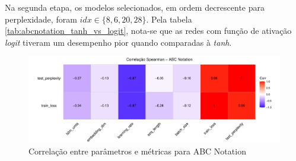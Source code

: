 \documentclass{automatextcc}
\begin{document}
Na segunda etapa, os modelos selecionados, em ordem decrescente para perplexidade, foram $idx \in \{8,6,20,28\}$. Pela tabela \ref{tab:abcnotation_tanh_vs_logit}, nota-se que as redes com função de ativação \textit{logit} tiveram um desempenho pior quando comparadas à \textit{tanh}.

\begin{figure}[H]
    \centering
    \includegraphics[width=\textwidth]{abcnotation_tanh_corr.pdf}
    \caption{Correlação entre parâmetros e métricas para ABC Notation}
    \label{fig:abcnotation_tanh_corr}
\end{figure}
\end{document}
